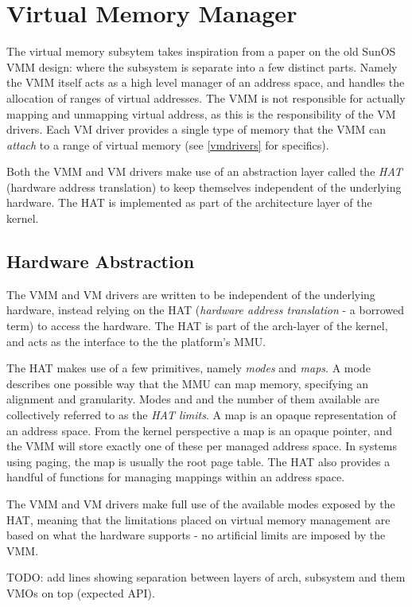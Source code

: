 \section{Virtual Memory Manager}
The virtual memory subsytem takes inspiration from a paper on the old SunOS VMM design: where the subsystem is separate into a few distinct parts. Namely the VMM itself acts as a high level manager of an address space, and handles the allocation of ranges of virtual addresses. The VMM is not responsible for actually mapping and unmapping virtual address, as this is the responsibility of the VM drivers. Each VM driver provides a single type of memory that the VMM can \textit{attach} to a range of virtual memory (see \autoref{vmdrivers} for specifics). 

Both the VMM and VM drivers make use of an abstraction layer called the \textit{HAT} (hardware address translation) to keep themselves independent of the underlying hardware. The HAT is implemented as part of the architecture layer of the kernel.

\subsection{Hardware Abstraction}
The VMM and VM drivers are written to be independent of the underlying hardware, instead relying on the HAT (\textit{hardware address translation} - a borrowed term) to access the hardware. The HAT is part of the arch-layer of the kernel, and acts as the interface to the the platform's MMU.

The HAT makes use of a few primitives, namely \textit{modes} and \textit{maps}. A mode describes one possible way that the MMU can map memory, specifying an alignment and granularity. Modes and and the number of them available are collectively referred to as the \textit{HAT limits}. A map is an opaque representation of an address space. From the kernel perspective a map is an opaque pointer, and the VMM will store exactly one of these per managed address space. In systems using paging, the map is usually the root page table. The HAT also provides a handful of functions for managing mappings within an address space.

The VMM and VM drivers make full use of the available modes exposed by the HAT, meaning that the limitations placed on virtual memory management are based on what the hardware supports - no artificial limits are imposed by the VMM.

TODO: add lines showing separation between layers of arch, subsystem and them VMOs on top (expected API).

